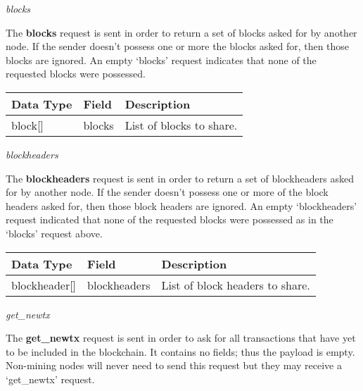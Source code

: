 \documentclass{article}
\begin{document}
\begin{center}
    \large \textit{blocks}
\end{center}
The \textbf{blocks} request is sent in order to return a set of blocks asked for by another node. If the sender doesn't possess one or more the blocks asked for, then those blocks are ignored. An empty `blocks' request indicates that none of the requested blocks were possessed.
\begin{table}[H]
\centering
\begin{tabular}{|p{1.5cm}|p{2.5cm}|p{5.5cm}|}
\hline
\rowcolor{tblgrey}
Data Type   & Field       & Description\\ \hline
block[\hspace{0.05cm}] & blocks & List of blocks to share.                    \\ \hline
\end{tabular}
\end{table}

\begin{center}
    \large \textit{blockheaders}
\end{center}
The \textbf{blockheaders} request is sent in order to return a set of blockheaders asked for by another node. If the sender doesn't possess one or more of the block headers asked for, then those block headers are ignored. An empty `blockheaders' request indicated that none of the requested blocks were possessed as in the `blocks' request above.
\begin{table}[H]
\centering
\begin{tabular}{|p{2.2cm}|p{2.5cm}|p{5.5cm}|}
\hline
\rowcolor{tblgrey}
Data Type   & Field       & Description\\ \hline
blockheader[\hspace{0.05cm}] & blockheaders & List of block headers to share.                    \\ \hline
\end{tabular}
\end{table}

\newpage

\begin{center}
    \large \textit{get\_newtx}
\end{center}
The \textbf{get\_newtx} request is sent in order to ask for all transactions that have yet to be included in the blockchain. It contains no fields; thus the payload is empty. Non-mining nodes will never need to send this request but they may receive a `get\_newtx' request.
\end{document}
